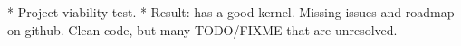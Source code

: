 
* Project viability test.
  * Result: has a good kernel. Missing issues and roadmap on github. Clean code, but many TODO/FIXME that are unresolved. 
  
  